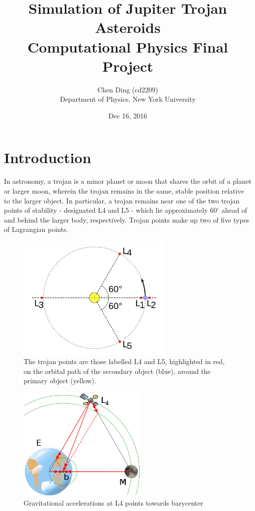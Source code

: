 \documentclass[12pt,a4paper]{article}
\begin{document}
\title{\textbf{Simulation of Jupiter Trojan Asteroids} \\ \large Computational Physics Final Project}
\author{Chen Ding (cd2209) \\ \small Department of Physics, New York University} 
\date{Dec 16, 2016}
\maketitle

\section{Introduction}

In astronomy, a trojan is a minor planet or moon that shares the orbit of a planet or larger moon, wherein the trojan remains in the same, stable position relative to the larger object. In particular, a trojan remains near one of the two trojan points of stability - designated L4 and L5 - which lie approximately 60$^{\circ}$ ahead of and behind the larger body, respectively. Trojan points make up two of five types of Lagrangian points.

\begin{figure}[H]
\centering
\includegraphics[width=3in]{500px-Lagrange_very_massive.png}
\caption{The trojan points are those labelled L4 and L5, highlighted in red, on the orbital path of the secondary object (blue), around the primary object (yellow).}
\end{figure}

\begin{figure}[H]
\centering
\includegraphics[width=2.5in]{403px-L4_diagram.png}
\caption{Gravitational accelerations at L4 points towards barycenter}
\end{figure}
\end{document}
